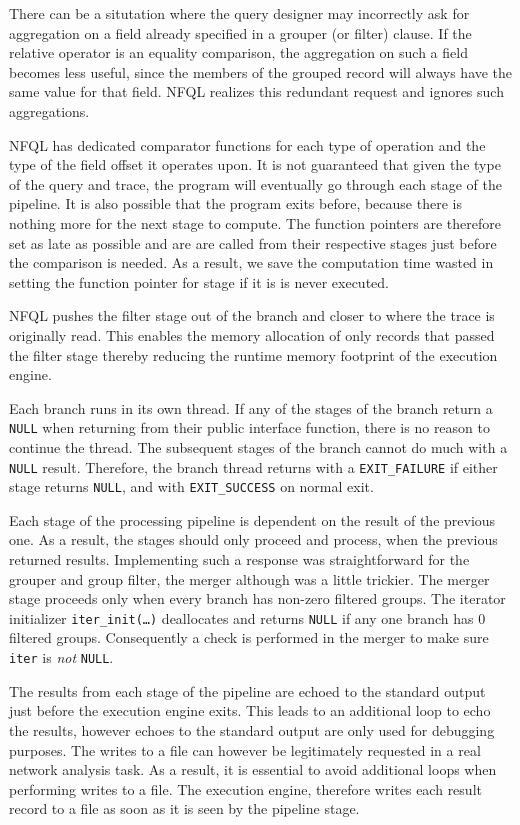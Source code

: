 There can be a situtation where the query designer may incorrectly ask for
aggregation on a field already specified in a grouper (or filter) clause. If
the relative operator is an equality comparison, the aggregation on such a
field becomes less useful, since the members of the grouped record will always
have the same value for that field. \ac{NFQL} realizes this redundant request
and ignores such aggregations.

\ac{NFQL} has dedicated comparator functions for each type of operation and
the type of the field offset it operates upon. It is not guaranteed that given
the type of the query and trace, the program will eventually go through each
stage of the pipeline. It is also possible that the program exits before,
because there is nothing more for the next stage to compute. The function
pointers are therefore set as late as possible and are are called from their
respective stages just before the comparison is needed.  As a result, we save
the computation time wasted in setting the function pointer for stage if it is
is never executed.

\ac{NFQL} pushes the filter stage out of the branch and closer to where the
trace is originally read. This enables the memory allocation of only records
that passed the filter stage thereby reducing the runtime memory footprint of
the execution engine.

Each branch runs in its own thread. If any of the stages of the branch return
a \texttt{NULL} when returning from their public interface function, there is
no reason to continue the thread. The subsequent stages of the branch cannot
do much with a \texttt{NULL} result.  Therefore, the branch thread returns
with a \texttt{EXIT\_FAILURE} if either stage returns \texttt{NULL}, and with
\texttt{EXIT\_SUCCESS} on normal exit.

Each stage of the processing pipeline is dependent on the result of the
previous one. As a result, the stages should only proceed and process, when
the previous returned results. Implementing such a response was
straightforward for the grouper and group filter, the merger although was a
little trickier.  The merger stage proceeds only when every branch has
non-zero filtered groups.  The iterator initializer
\texttt{iter\_init(\ldots)} deallocates and returns \texttt{NULL} if any one
branch has $0$ filtered groups.  Consequently a check is performed in the
merger to make sure \texttt{iter} is \emph{not} \texttt{NULL}.

The results from each stage of the pipeline are echoed to the standard output
just before the execution engine exits. This leads to an additional loop to
echo the results, however echoes to the standard output are only used for
debugging purposes. The writes to a file can however be legitimately requested
in a real network analysis task. As a result, it is essential to avoid
additional loops when performing writes to a file. The execution engine,
therefore writes each result record to a file as soon as it is seen by the
pipeline stage.
